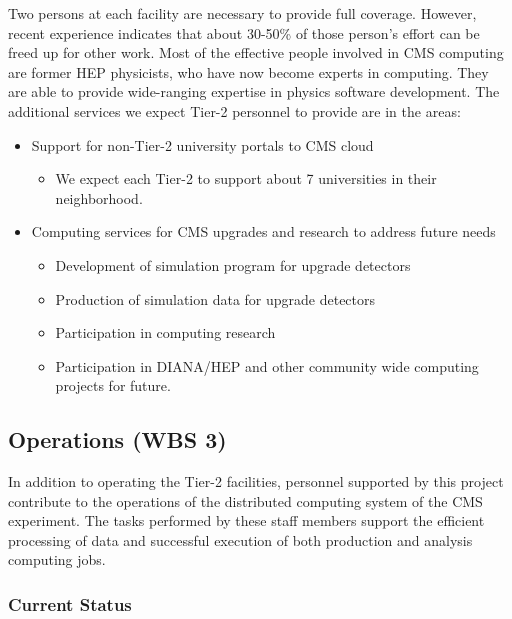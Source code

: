 \documentclass[11pt,a4paper]{article}
\begin{document}

Two persons at each facility are necessary to provide full coverage.
However, recent experience indicates that about 30-50\% of those
person's effort can be freed up for other work. Most of the effective
people involved in CMS computing are former HEP physicists, who have
now become experts in computing. They are able to provide wide-ranging
expertise in physics software development.  The additional services we
expect Tier-2 personnel to provide are in the areas:
\begin{itemize}
\item Support for non-Tier-2 university portals to CMS cloud
\begin{itemize}
\item We expect each Tier-2 to support about 7 universities in their neighborhood.
\end{itemize}
\item Computing services for CMS upgrades and research to address future needs
\begin{itemize}
\item Development of simulation program for upgrade detectors
\item Production of simulation data for upgrade detectors
\item Participation in computing research
\item Participation in DIANA/HEP and other community wide computing projects for future.
\end{itemize}
\end{itemize} 

\subsection{Operations (WBS 3)}

In addition to operating the Tier-2 facilities, personnel supported by this
project contribute to the operations of the distributed computing system of
the CMS experiment.  The tasks performed by these staff members support the
efficient processing of data and successful execution of both production
and analysis computing jobs.

\subsubsection{Current Status}
\end{document}
